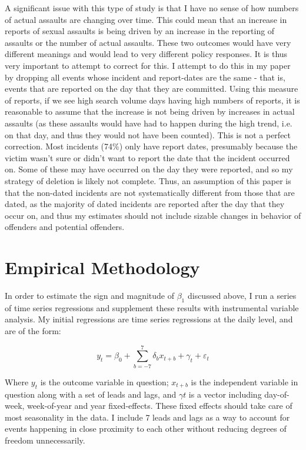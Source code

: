 \documentclass[AER,draftmode]{AEA}
\begin{document}
A significant issue with this type of study is that I have no sense of how numbers of actual assaults are changing over time. This could mean that an increase in reports of sexual assaults is being driven by an increase in the reporting of assaults or the number of actual assaults. These two outcomes would have very different meanings and would lead to very different policy responses. It is thus very important to attempt to correct for this. I attempt to do this in my paper by dropping all events whose incident and report-dates are the same - that is, events that are reported on the day that they are committed. Using this measure of reports, if we see high search volume days having high numbers of reports, it is reasonable to assume that the increase is not being driven by increases in actual assaults (as these assaults would have had to happen during the high trend, i.e. on that day, and thus they would not have been counted). This is not a perfect correction. Most incidents (74\%) only have report dates, presumably because the victim wasn't sure or didn't want to report the date that the incident occurred on. Some of these may have occurred on the day they were reported, and so my strategy of deletion is likely not complete. Thus, an assumption of this paper is that the non-dated incidents are not systematically different from those that are dated, as the majority of dated incidents are reported after the day that they occur on, and thus my estimates should not include sizable changes in behavior of offenders and potential offenders.

\section{Empirical Methodology}

In order to estimate the sign and magnitude of $\beta_1$ discussed above, I run a series of time series regressions and supplement these results with instrumental variable analysis. My initial regressions are time series regressions at the daily level, and are of the form: 

$$ 
y_{t} = \beta_{0} + \sum_{b=-7}^{7} \delta_{b} x_{t+b} + \gamma_{t} + \varepsilon_{t}
$$

Where $y_{t}$ is the outcome variable in question; $x_{t+b}$ is the independent variable in question along with a set of leads and lags, and $\gamma{t}$ is a vector including day-of-week, week-of-year and year fixed-effects. These fixed effects should take care of most seasonality in the data. I include 7 leads and lags as a way to account for events happening in close proximity to each other without reducing degrees of freedom unnecessarily.
\end{document}
